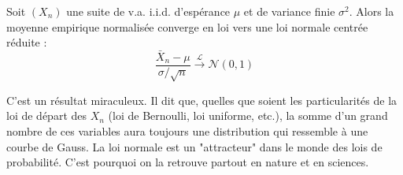 \begin{theorem}
    Soit $(X_n)$ une suite de v.a. i.i.d. d'espérance $\mu$ et de variance finie $\sigma^2$. Alors la moyenne empirique normalisée converge en loi vers une loi normale centrée réduite :
    $$ \frac{\bar{X}_n - \mu}{\sigma/\sqrt{n}} \xrightarrow{\mathcal{L}} \mathcal{N}(0,1) $$
\end{theorem}

\begin{remark}
    C'est un résultat miraculeux. Il dit que, quelles que soient les particularités de la loi de départ des $X_n$ (loi de Bernoulli, loi uniforme, etc.), la somme d'un grand nombre de ces variables aura toujours une distribution qui ressemble à une courbe de Gauss. La loi normale est un "attracteur" dans le monde des lois de probabilité. C'est pourquoi on la retrouve partout en nature et en sciences.
\end{remark}